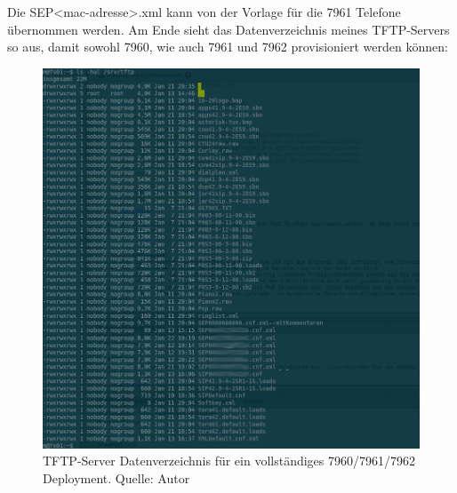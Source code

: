 \documentclass[a4paper,12pt]{scrbook}
\begin{document}
Die SEP<mac-adresse>.xml kann von der Vorlage für die 7961 Telefone übernommen werden. Am Ende sieht das Datenverzeichnis meines TFTP-Servers so aus, damit sowohl 7960, wie auch 
7961 und 7962 provisioniert werden können:

\begin{figure}[H]
\begin{center}
\includegraphics[width=1\hsize]{./images/atftpd-cisco7960-7961-7962.png}
\end{center}
\caption[TFTP-Server Datenverzeichnis für ein vollständiges 7960/7961/7962 Deployment.]
{\label{atftpd-7960-7961-7962}TFTP-Server Datenverzeichnis für ein vollständiges 7960/7961/7962 Deployment. Quelle: Autor}
\end{figure}
\end{document}

